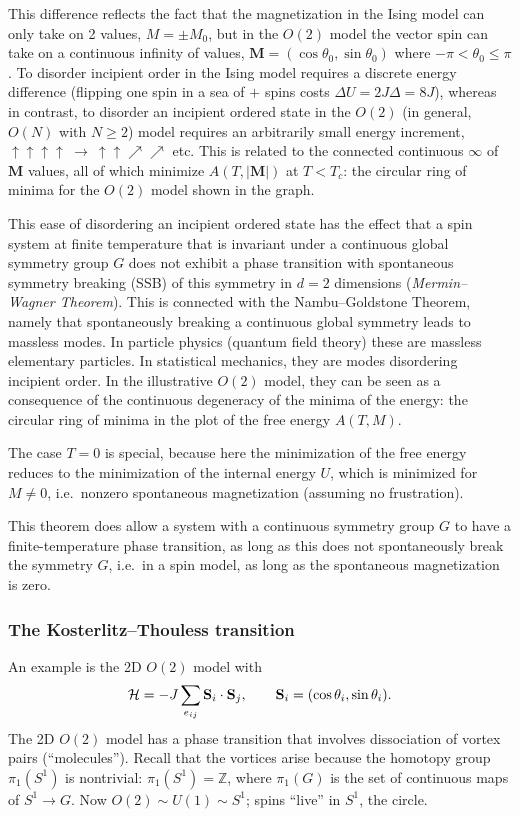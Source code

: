 This difference reflects the fact that the magnetization in the Ising model can only take on 2 values,
$M = \pm M_0$, but in the $O(2)$ model the vector spin can take on a continuous infinity of values,
$\mathbf{M} = (\cos\theta_0,\sin\theta_0)$ where $-\pi<\theta_0\le\pi$. To disorder incipient order in
the Ising model requires a discrete energy difference (flipping one spin in a sea of $+$ spins costs
$\Delta U = 2J\Delta = 8J$), whereas in contrast, to disorder an incipient ordered state in the $O(2)$
(in general, $O(N)$ with $N\ge 2$) model requires an arbitrarily small energy increment,
$\uparrow\uparrow\uparrow\uparrow\ \to\ \uparrow\uparrow\nearrow\nearrow$ etc. This is related to the
connected continuous $\infty$ of $\mathbf{M}$ values, all of which minimize $A(T,|\mathbf{M}|)$ at
$T<T_c$: the circular ring of minima for the $O(2)$ model shown in the graph.

This ease of disordering an incipient ordered state has the effect that a spin system at finite
temperature that is invariant under a continuous global symmetry group $G$ does not exhibit a phase
transition with spontaneous symmetry breaking (SSB) of this symmetry in $d = 2$ dimensions
(\emph{Mermin--Wagner Theorem}). This is connected with the Nambu--Goldstone Theorem, namely that
spontaneously breaking a continuous global symmetry leads to massless modes. In particle physics
(quantum field theory) these are massless elementary particles. In statistical mechanics, they are
modes disordering incipient order. In the illustrative $O(2)$ model, they can be seen as a consequence
of the continuous degeneracy of the minima of the energy: the circular ring of minima in the plot of
the free energy $A(T,M)$.

The case $T = 0$ is special, because here the minimization of the free energy reduces to the
minimization of the internal energy $U$, which is minimized for $M\ne 0$, i.e.\ nonzero spontaneous
magnetization (assuming no frustration).

This theorem does allow a system with a continuous symmetry group $G$ to have a finite-temperature phase
transition, as long as this does not spontaneously break the symmetry $G$, i.e.\ in a spin model, as
long as the spontaneous magnetization is zero.

\subsubsection*{The Kosterlitz--Thouless transition}

An example is the 2D $O(2)$ model with
\begin{equation}
  \mathcal{H} = -J\sum_{e_{ij}}\mathbf{S}_i\cdot\mathbf{S}_j,\qquad \mathbf{S}_i = (\cos\theta_i,\sin\theta_i).
\end{equation}
The 2D $O(2)$ model has a phase transition that involves dissociation of vortex pairs (``molecules'').
Recall that the vortices arise because the homotopy group $\pi_1(S^1)$ is nontrivial:
$\pi_1(S^1) = \mathbb{Z}$, where $\pi_1(G)$ is the set of continuous maps of $S^1\to G$. Now
$O(2)\sim U(1)\sim S^1$; spins ``live'' in $S^1$, the circle.

